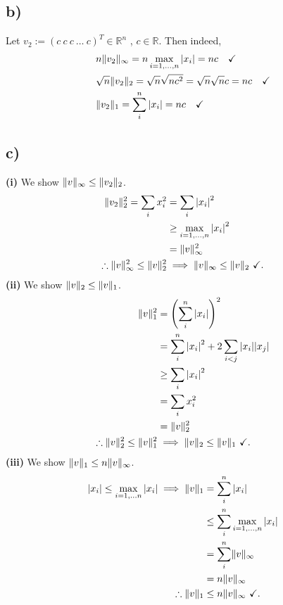 \documentclass[12pt]{article}
\DeclarePairedDelimiter{\norm}{\lVert}{\rVert}
\theoremstyle{definition}
\theoremstyle{definition}
\theoremstyle{definition}
\theoremstyle{definition}
\theoremstyle{definition}
\theoremstyle{example}
\theoremstyle{note}
\theoremstyle{remark}
\theoremstyle{example}
\begin{document}
			\subsection*{b) }
				Let $v_{2} := (c \ c \ c \ \dots \ c)^{T} \in \mathbb{R}^{n}$ , $c \in \mathbb{R}$. Then indeed, 
				\begin{align*}
					&n \norm{v_{2}}_{\infty} = n \max\limits_{i= 1,\dots,n} \abs{x_{i}} = nc  \quad \checkmark \\
					&\sqrt{n} \norm{v_{2}}_{2} = \sqrt{n} \sqrt{n c^{2}} = \sqrt{n} \sqrt{n} c = nc \quad \checkmark \\
					&\norm{v_{2}}_{1} = \sum_{i}^{n} \abs{x_{i}} = nc \quad \checkmark
				\end{align*}
			\subsection*{c) }
				\textbf{(i)} We show $\norm{v}_{\infty} \le \norm{v_{2}}_{2}$. 
				\begin{align*}
					 \norm{v_{2}}_{2}^{2} = \sum_{i} x_{i}^{2} &= \sum_{i} \abs{x_{i}}^{2} \\
					 &\ge \max\limits_{i = 1,\dots,n} \abs{x_{i}}^{2} \\
					 &= \norm{v}_{\infty}^{2} \\
					 \therefore \norm{v}_{\infty}^{2} \le \norm{v}_{2}^{2} &\implies \norm{v}_{\infty} \le \norm{v}_{2} \ \checkmark.
				\end{align*}
			\textbf{(ii)} We show $\norm{v}_{2} \le \norm{v}_{1}$. 
				\begin{align*}
					 \norm{v}_{1}^{2} &= \left( \sum_{i}^{n} \abs{x_{i}}\right)^{2} \\&= \sum_{i}^{n} \abs{x_{i}}^{2} + 2 \sum_{i < j} \abs{x_{i}} \abs{x_{j}} \\
					 & \ge \sum_{i} \abs{x_{i}}^{2} \\
					 &= \sum_{i} x_{i}^{2} \\
					 &= \norm{v}_{2}^{2}\\
					 \therefore \norm{v}_{2}^{2} \le \norm{v}_{1}^{2} & \implies \norm{v}_{2} \le \norm{v}_{1} \ \checkmark.
				\end{align*}
			\textbf{(iii)} We show $\norm{v}_{1} \le n \norm{v}_{\infty }$.
				\begin{align*}
					\abs{x_{i}} \le \max\limits_{i = 1 , \dots n} \abs{x_{i}} \implies \norm{v}_{1} &= \sum_{i}^{n} \abs{x_{i}} \\&\le \sum_{i}^{n} \max\limits_{i = 1,\dots ,n} \abs{x_{i}} \\
					&= \sum_{i}^{n} \norm{v}_{\infty} \\
					&= n \norm{v}_{\infty}\\
					\therefore \norm{v}_{1} &\le n \norm{v}_{\infty} \ \checkmark.
				\end{align*}
\end{document}
